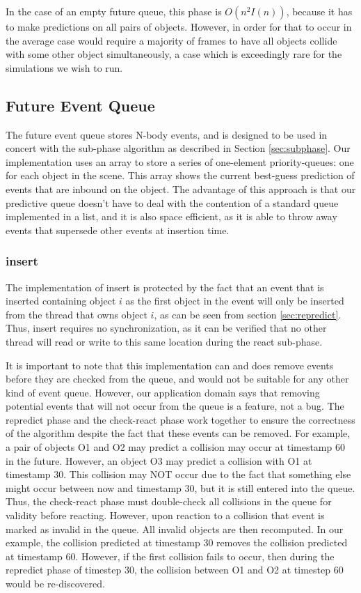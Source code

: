 \documentclass[CEJCS,PDF]{cej} %
\begin{document}
In the case of an empty future queue, this phase is $O(n^2 I(n))$, because it has to make predictions on all pairs of objects.  However, in order for that to occur in the average case would require a majority of frames to have all objects collide
with some other object simultaneously, a case which is exceedingly rare for the simulations we wish to run.

\subsection{Future Event Queue}
\label{feq}
The future event queue stores N-body events, and is designed to be used in concert with the sub-phase algorithm as described in Section \ref{sec:subphase}.
Our implementation uses an array to store a series of one-element priority-queues: one for each object in the scene.  This array shows the current best-guess
prediction of events that are inbound on the object.  The advantage of this approach is that our predictive queue doesn't have to deal with the contention of 
a standard queue implemented in a list, and it is also space efficient, as it is able to throw away events that supersede other events at insertion time.


\subsubsection{insert}

The implementation of insert is protected by the fact that an event that is inserted containing object $i$ as the first object in the event will only
be inserted from the thread that owns object $i$, as can be seen from section \ref{sec:repredict}.  Thus, insert requires no synchronization, as it can be verified
that no other thread will read or write to this same location during the react sub-phase.  

It is important to note that this implementation can and does remove events before they are checked from the queue,
and would not be suitable for any other kind of event queue.  However, our application domain says that removing potential events that will not occur from the queue is a feature, not a bug.
The repredict phase and the check-react phase work together to ensure the correctness of the algorithm despite the fact that these events can be removed.
For example, a pair of objects O1 and O2 may predict a collision may occur at timestamp 60 in the future.  However, an object O3 may predict a collision with O1 at timestamp 30.
This collision may NOT occur due to the fact that something else might occur between now and timestamp 30, but it is still entered into the queue.  Thus, the check-react phase must double-check
all collisions in the queue for validity before reacting.  However, upon reaction to a collision that event is marked as invalid in the queue.  All invalid
objects are then recomputed.  In our example, the collision predicted at timestamp 30 removes the collision predicted at timestamp 60.  However,
if the first collision fails to occur, then during the repredict phase of timestep 30, the collision between O1 and O2 at timestep 60 would be re-discovered.
\end{document}
